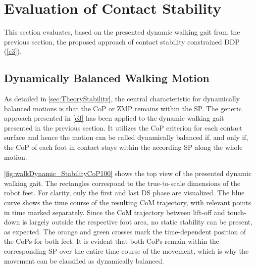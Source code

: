 

\section{Evaluation of Contact Stability}\label{sec:BipedEvaluation}
This section evaluates, based on the presented dynamic walking gait from the previous section, the proposed approach of contact stability constrained DDP (\cref{c3}).

\subsection{Dynamically Balanced Walking Motion}
As detailed in \cref{sec:TheoryStability}, the central characteristic for dynamically balanced motions is that the \gls{CoP} or \gls{ZMP} remains within the \gls{SP}. The generic approach presented in \cref{c3} has been applied to the dynamic walking gait presented in the previous section. It utilizes the \gls{CoP} criterion for each contact surface and hence the motion can be called dynamically balanced if, and only if, the \gls{CoP} of each foot in contact stays within the according \gls{SP} along the whole motion. 

\cref{fig:walkDynamic_StabilityCoP100} shows the top view of the presented dynamic walking  gait. The rectangles correspond to the true-to-scale dimensions of the robot feet. For clarity, only the first and last \gls{DS} phase are visualized.  
The blue curve shows the time course of the resulting \gls{CoM} trajectory, with relevant points in time marked separately. Since the \gls{CoM} trajectory between lift-off and touch-down is largely outside the respective foot area, no static stability can be present, as expected. 
The orange and green crosses mark the time-dependent position of the \gls{CoP}s for both feet. It is evident that both \gls{CoP}s remain within the corresponding SP over the entire time course of the movement, which is why the movement can be classified as dynamically balanced. 

